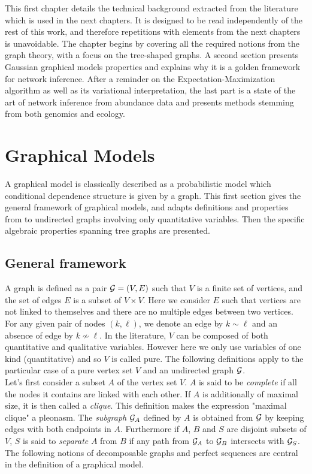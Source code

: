 
\vspace{1cm}
This first chapter  details the technical background extracted from the literature which is used in the next chapters. It is designed to be read independently  of the rest of this work, and therefore repetitions with elements from the next chapters is unavoidable.  The chapter begins by covering all the required notions from the graph theory, with a  focus on the tree-shaped graphs. A second section  presents Gaussian graphical models properties and explains why it is a golden framework for network inference. After a reminder on the Expectation-Maximization algorithm as well as its variational interpretation, the last part is a state of the art of network inference from abundance data and presents methods stemming from both genomics and ecology. 


 \section{Graphical Models}
 A graphical model is classically described as a probabilistic model which conditional dependence structure is given by a graph. This first section gives the general framework of graphical models, and adapts definitions and properties from \citet{Lau96} to  undirected graphs involving only quantitative variables.  Then the specific algebraic properties  spanning tree graphs are presented.
 \subsection{General framework}
 A graph is defined as a pair $\mathcal{G}=(V,E)$ such that $V$ is a finite set of vertices, and the set of edges $E$ is a subset of $V\times V$. Here we consider $E$ such that vertices are not linked to themselves and there are no multiple edges between two vertices. For any given pair of nodes $(k,\ell)$, we denote an edge by $k\sim\ell$ and an absence of edge by $k\nsim \ell$. In the literature, $V$ can be composed of both quantitative and qualitative variables. However here we  only use variables of one kind (quantitative) and so $V$ is called pure. The following definitions apply to the particular case of a pure vertex set $V$ and an undirected graph $\mathcal{G}$.\\

Let's first consider a subset $A$ of the vertex set $V$. $A$ is said to be \textit{complete} if all the nodes it contains are linked with each other. If $A$ is additionally of maximal size, it is then called a \textit{clique}. This definition makes the expression "maximal clique" a pleonasm. The \textit{subgraph} $\mathcal{G}_A$ defined by $A$  is obtained from $\mathcal{G}$ by keeping edges with both endpoints in $A$. Furthermore if $A$, $B$ and $S$ are disjoint subsets of $V$, $S$ is said to \textit{separate} $A$ from $B$ if any path from $\mathcal{G}_A$ to $\mathcal{G}_B$ intersects with $\mathcal{G}_S$. The following notions of decomposable graphs and perfect sequences are central in the definition of a graphical model.
 
